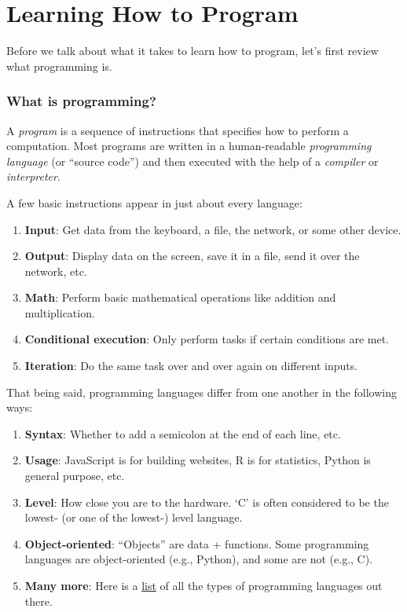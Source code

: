 \documentclass[]{book}
\providecommand{\tightlist}{%
  \setlength{\itemsep}{0pt}\setlength{\parskip}{0pt}}
\begin{document}
\section{Learning How to Program}\label{learning-how-to-program}

Before we talk about what it takes to learn how to program, let's first
review what programming is.

\subsubsection*{What is programming?}\label{what-is-programming}

A \emph{program} is a sequence of instructions that specifies how to
perform a computation. Most programs are written in a human-readable
\emph{programming language} (or ``source code'') and then executed with
the help of a \emph{compiler} or \emph{interpreter}.

A few basic instructions appear in just about every language:

\begin{enumerate}
\def\labelenumi{\arabic{enumi}.}
\tightlist
\item
  \textbf{Input}: Get data from the keyboard, a file, the network, or
  some other device.
\item
  \textbf{Output}: Display data on the screen, save it in a file, send
  it over the network, etc.
\item
  \textbf{Math}: Perform basic mathematical operations like addition and
  multiplication.
\item
  \textbf{Conditional execution}: Only perform tasks if certain
  conditions are met.
\item
  \textbf{Iteration}: Do the same task over and over again on different
  inputs.
\end{enumerate}

That being said, programming languages differ from one another in the
following ways:

\begin{enumerate}
\def\labelenumi{\arabic{enumi}.}
\tightlist
\item
  \textbf{Syntax}: Whether to add a semicolon at the end of each line,
  etc.
\item
  \textbf{Usage}: JavaScript is for building websites, R is for
  statistics, Python is general purpose, etc.
\item
  \textbf{Level}: How close you are to the hardware. `C' is often
  considered to be the lowest- (or one of the lowest-) level language.
\item
  \textbf{Object-oriented}: ``Objects'' are data + functions. Some
  programming languages are object-oriented (e.g., Python), and some are
  not (e.g., C).
\item
  \textbf{Many more}: Here is a
  \href{https://en.wikipedia.org/wiki/List_of_programming_languages_by_type}{list}
  of all the types of programming languages out there.
\end{enumerate}
\end{document}
